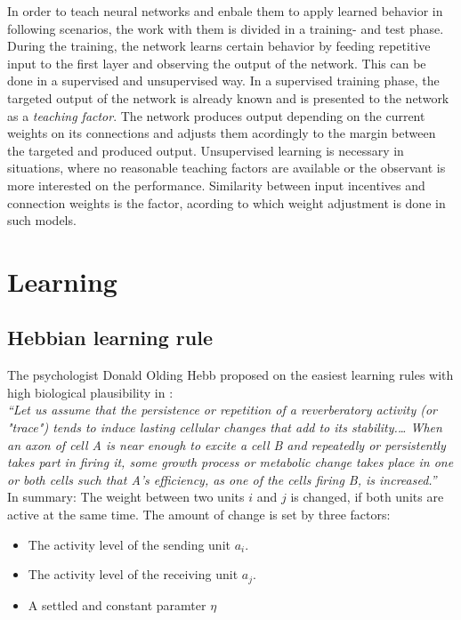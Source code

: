 \documentclass[10pt,a4paper,DIV=11]{scrreprt}
\begin{document}
In order to teach neural networks and enbale them to apply learned behavior in following scenarios, the work with them is divided in a training- and test phase. During the training, the network learns certain behavior by feeding repetitive input to the first layer and observing the output of the network. This can be done in a supervised and unsupervised way. In a supervised training phase, the targeted output of the network is already known and is presented to the network as a \textit{teaching factor}. The network produces output depending on the current weights on its connections and adjusts them acordingly to the margin between the targeted and produced output. Unsupervised learning is necessary in situations, where no reasonable teaching factors are available or the observant is more interested on the performance. Similarity between input incentives and connection weights is the factor, acording to which weight adjustment is done in such models.

\section{Learning}\label{sec:learning}
\subsection{Hebbian learning rule}
The psychologist Donald Olding Hebb proposed on the easiest learning rules with high biological plausibility in \cite{HEBB}:\\

\textit{``Let us assume that the persistence or repetition of a reverberatory activity (or "trace") tends to induce lasting cellular changes that add to its stability.… When an axon of cell A is near enough to excite a cell B and repeatedly or persistently takes part in firing it, some growth process or metabolic change takes place in one or both cells such that A's efficiency, as one of the cells firing B, is increased.''}\\

In summary: The weight between two units $i$ and $j$ is changed, if both units are active at the same time. The amount of change is set by three factors:

\begin{itemize}
\item The activity level of the sending unit $a_i$.
\item The activity level of the receiving unit $a_j$.
\item A settled and constant paramter $\eta$
\end{itemize}
\end{document}

